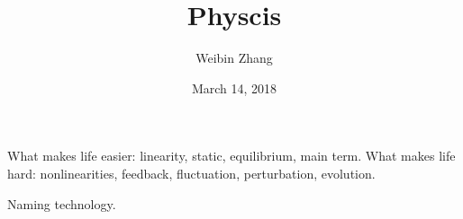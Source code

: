 \documentclass[12pt]{report}
\title{Physcis}
\author{Weibin Zhang}
\date{March 14, 2018}
\begin{document}
\maketitle

\tableofcontents
What makes life easier: linearity, static, equilibrium, main term.
What makes life hard: nonlinearities, feedback, fluctuation, perturbation,
evolution.














Naming technology.
\end{document}
